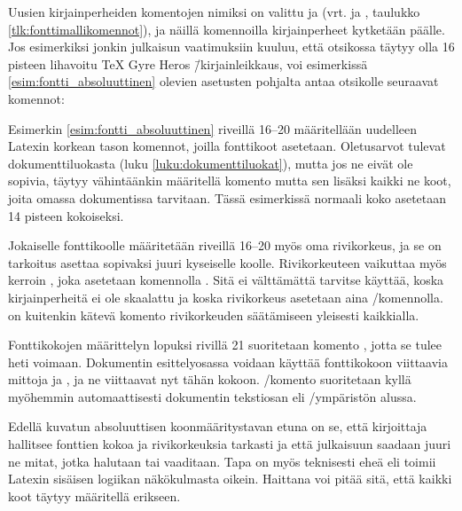 Uusien kirjainperheiden komentojen nimiksi on valittu  ja  (vrt.
 ja , taulukko
\ref{tlk:fonttimallikomennot}), ja näillä komennoilla kirjainperheet
kytketään päälle. Jos esimerkiksi jonkin julkaisun vaatimuksiin kuuluu,
että otsikossa täytyy olla 16 pisteen lihavoitu TeX Gyre Heros
\=/kirjainleikkaus, voi esimerkissä \ref{esim:fontti_absoluuttinen}
olevien asetusten pohjalta antaa otsikolle seuraavat komennot:

\begin{koodilohkosis}
  \sffamilyabs\fontsize{16bp}{18bp}\bfseries
\end{koodilohkosis}

Esimerkin \ref{esim:fontti_absoluuttinen} riveillä 16--20 määritellään
uudelleen Latexin korkean tason komennot, joilla fonttikoot asetetaan.
Oletus\-arvot tulevat dokumenttiluokasta (luku
\ref{luku:dokumenttiluokat}), mutta jos ne eivät ole sopivia, täytyy
vähintäänkin määritellä komento  mutta sen
lisäksi kaikki ne koot, joita omassa dokumentissa tarvitaan. Tässä
esimerkissä normaali koko asetetaan 14 pisteen kokoiseksi.

Jokaiselle fonttikoolle määritetään riveillä 16--20 myös oma
rivikorkeus, ja se on tarkoitus asettaa sopivaksi juuri kyseiselle
koolle. Rivikorkeuteen vaikuttaa myös kerroin , joka asetetaan komennolla .
Sitä ei välttämättä tarvitse käyttää, koska kirjainperheitä ei ole
skaalattu ja koska rivikorkeus asetetaan aina \-/komennolla.  on kuitenkin kätevä
komento rivikorkeuden säätämiseen yleisesti kaikkialla.

Fonttikokojen määrittelyn lopuksi rivillä 21 suoritetaan komento
, jotta se tulee heti voimaan. Dokumentin
esittelyosassa voidaan käyttää fonttikokoon viittaavia mittoja
 ja , ja ne viittaavat nyt tähän kokoon.
\-/komento suoritetaan kyllä myöhemmin
automaattisesti dokumentin tekstiosan eli \-/ympäristön
alussa.

Edellä kuvatun absoluuttisen koonmääritystavan etuna on se, että
kirjoittaja hallitsee fonttien kokoa ja rivikorkeuksia tarkasti ja että
julkaisuun saadaan juuri ne mitat, jotka halutaan tai vaaditaan. Tapa on
myös teknisesti eheä eli toimii Latexin sisäisen logiikan näkökulmasta
oikein. Haittana voi pitää sitä, että kaikki koot täytyy määritellä
erikseen.

